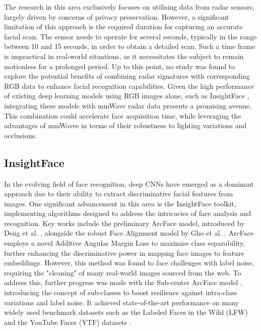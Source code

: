 \documentclass{interim}
\begin{document}
The research in this area exclusively focuses on utilising data from radar sensors, largely driven by concerns of privacy preservation. However, a significant limitation of this approach is the required duration for capturing an accurate facial scan. The sensor needs to operate for several seconds, typically in the range between 10 and 15 seconds, in order to obtain a detailed scan. Such a time frame is impractical in real-world situations, as it necessitates the subject to remain motionless for a prolonged period. Up to this point, no study was found to explore the potential benefits of combining radar signatures with corresponding RGB data to enhance facial recognition capabilities. Given the high performance of existing deep learning models using RGB images alone, such as InsightFace \cite{deng2018arcface}, integrating these models with mmWave radar data presents a promising avenue. This combination could accelerate face acquisition time, while leveraging the advantages of mmWaves in terms of their robustness to lighting variations and occlusions.


\subsection{InsightFace}
\label{background:insightface}
In the evolving field of face recognition, deep CNNs have emerged as a dominant approach due to their ability to extract discriminative facial features from images. One significant advancement in this area is the InsightFace toolkit, implementing algorithms designed to address the intricacies of face analysis and recognition. Key works include the preliminary ArcFace model, introduced by Deng et al. \cite{deng2018arcface}, alongside the robust Face Alignment model by Gho et al. \cite{guo2018stacked}. ArcFace employs a novel Additive Angular Margin Loss to maximise class separability, further enhancing the discriminative power in mapping face images to feature embeddings. However, this method was found to face challenges with label noise, requiring the "cleaning" of many real-world images sourced from the web. To address this, further progress was made with the Sub-center ArcFace model \cite{deng2020subcenter}, introducing the concept of sub-classes to boost resilience against intra-class variations and label noise. It achieved state-of-the-art performance on many widely used benchmark datasets such as the Labeled Faces in the Wild (LFW) \cite{huang2008labeled} and the YouTube Faces (YTF) datasets \cite{wolf2011face}.
\end{document}
